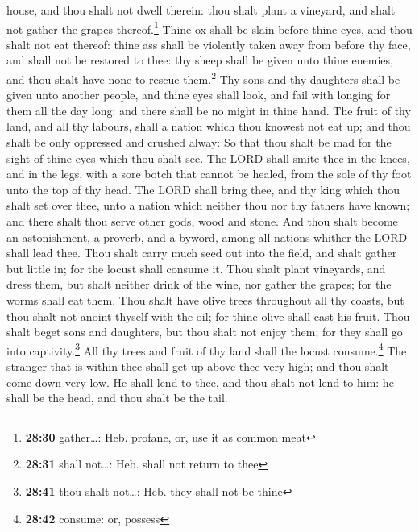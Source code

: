 house, and thou shalt not dwell therein: thou shalt plant a vineyard,
and shalt not gather the grapes thereof.\footnote{\textbf{28:30}
  gather\ldots: Heb. profane, or, use it as common meat} 
Thine ox shall be slain before thine eyes, and thou shalt not eat
thereof: thine ass shall be violently taken away from before thy face,
and shall not be restored to thee: thy sheep shall be given unto thine
enemies, and thou shalt have none to rescue them.\footnote{\textbf{28:31}
  shall not\ldots: Heb. shall not return to thee}  Thy
sons and thy daughters shall be given unto another people, and thine
eyes shall look, and fail with longing for them all the day long: and
there shall be no might in thine hand.  The fruit of thy
land, and all thy labours, shall a nation which thou knowest not eat up;
and thou shalt be only oppressed and crushed alway:  So
that thou shalt be mad for the sight of thine eyes which thou shalt see.
 The LORD shall smite thee in the knees, and in the legs,
with a sore botch that cannot be healed, from the sole of thy foot unto
the top of thy head.  The LORD shall bring thee, and thy
king which thou shalt set over thee, unto a nation which neither thou
nor thy fathers have known; and there shalt thou serve other gods, wood
and stone.  And thou shalt become an astonishment, a
proverb, and a byword, among all nations whither the LORD shall lead
thee.  Thou shalt carry much seed out into the field, and
shalt gather but little in; for the locust shall consume it.
 Thou shalt plant vineyards, and dress them, but shalt
neither drink of the wine, nor gather the grapes; for the worms shall
eat them.  Thou shalt have olive trees throughout all thy
coasts, but thou shalt not anoint thyself with the oil; for thine olive
shall cast his fruit.  Thou shalt beget sons and
daughters, but thou shalt not enjoy them; for they shall go into
captivity.\footnote{\textbf{28:41} thou shalt not\ldots: Heb. they shall
  not be thine}  All thy trees and fruit of thy land
shall the locust consume.\footnote{\textbf{28:42} consume: or, possess}
 The stranger that is within thee shall get up above thee
very high; and thou shalt come down very low.  He shall
lend to thee, and thou shalt not lend to him: he shall be the head, and
thou shalt be the tail.

